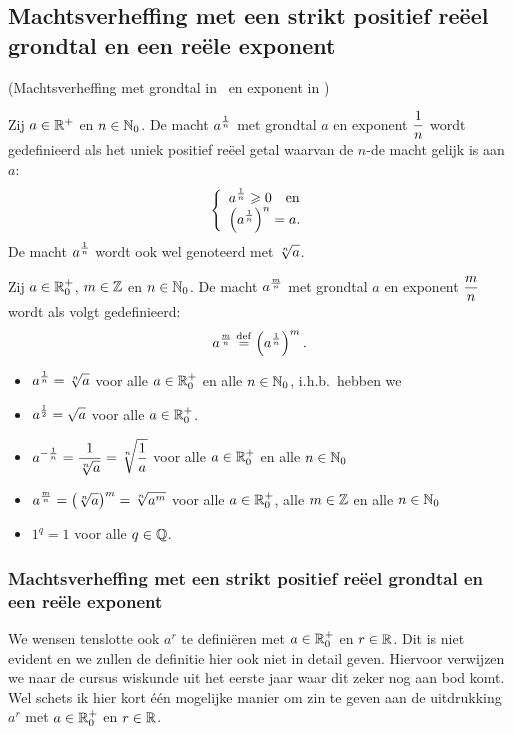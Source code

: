 \documentclass{ximera}
\begin{document}
\subsection{Machtsverheffing met een strikt positief re\"eel grondtal en een re\"ele exponent}
\begin{definition}(Machtsverheffing met grondtal in \Rplus\ en exponent in \Q)
	
	
	Zij $a\in\mathbb{R}^+$ en $n\in\mathbb{N}_0$. De macht $\displaystyle
	a^{\frac{1}{n}}$ met grondtal $a$ en exponent $\displaystyle\frac{1}{n}$ wordt
	gedefinieerd als het uniek positief re\"eel getal waarvan de $n$-de
	macht gelijk is aan $a$:
	\[\left\{
	\begin{array}{l}
	\displaystyle a^{\frac{1}{n}}\geqslant 0\textrm{\ \ \ en}\\
	\displaystyle\left(a^{\frac{1}{n}}\right)^n=a.\\
	\end{array}
	\right.\] De macht $\displaystyle a^{\frac{1}{n}}$ wordt ook wel genoteerd
	met $\displaystyle\sqrt[n]{a}$.
	
	Zij $a\in\mathbb{R}_0^+$, $m\in\mathbb{Z}$ en $n\in\mathbb{N}_0$. De macht $\displaystyle
	a^{\frac{m}{n}}$ met grondtal $a$ en exponent $\displaystyle\frac{m}{n}$
	wordt als volgt gedefinieerd:
	\[a^{\frac{m}{n}}\overset{\mathrm{def}}{=} \left(a^{\frac{1}{n}}\right)^m.\]
\end{definition}
\begin{example}
	\begin{itemize}
		\item $\displaystyle a^{\frac{1}{n}}=\sqrt[n]{a}$ voor alle $a\in\mathbb{R}_0^+$ en alle
		$n\in\mathbb{N}_0$, i.h.b.~hebben we
		\item $\displaystyle a^{\frac{1}{2}}=\sqrt{a}$ voor alle $a\in\mathbb{R}_0^+$.
		\item $\displaystyle a^{-\frac{1}{n}}=\frac{1}{\sqrt[n]{a}}=\sqrt[n]{\frac{1}{a}}$ voor alle $a\in\mathbb{R}_0^+$ en alle $n\in\mathbb{N}_0$
		\item $\displaystyle a^{\frac{m}{n}}=\left(\sqrt[n]{a}\right)^m=\sqrt[n]{a^m}$ voor alle $a\in\mathbb{R}_0^+$, alle $m\in\mathbb{Z}$ en alle $n\in\mathbb{N}_0$
		\item $1^q=1$ voor alle $q\in\mathbb{Q}$.
	\end{itemize}
\end{example}
\subsubsection*{Machtsverheffing met een strikt positief re\"eel grondtal en een re\"ele exponent}
We wensen tenslotte ook $a^r$ te defini\"eren met $a\in\mathbb{R}_0^+$
en $r\in\mathbb{R}$. Dit is niet evident en we zullen de definitie hier
ook niet in detail geven. Hiervoor verwijzen we naar de cursus
wiskunde uit het eerste jaar waar dit zeker nog aan bod komt. Wel
schets ik hier kort \'{e}\'{e}n mogelijke manier om zin te geven
aan de uitdrukking $a^r$ met $a\in\mathbb{R}_0^+$ en $r\in\mathbb{R}$.
\end{document}
